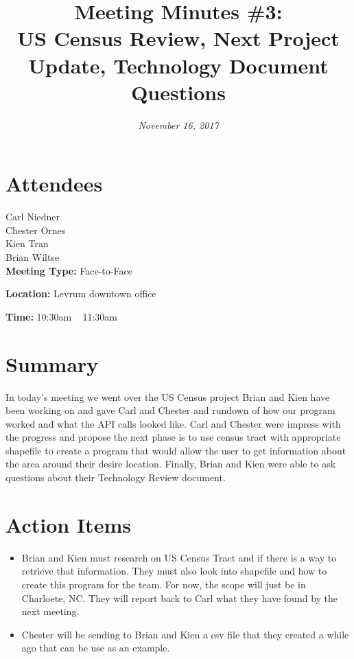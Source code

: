 \documentclass[10pt, onecolumn, draftclsnofoot, letterpaper, compsoc]{IEEEtran}
\title{Meeting Minutes \#3:\\ US Census Review, Next Project Update, Technology Document Questions}
\author{
	\textit{November 16, 2017}}
\begin{document}
\maketitle
\section{Attendees}
Carl Niedner\\
Chester Ornes\\
Kien Tran\\
Brian Wiltse\\

\textbf{Meeting Type:} Face-to-Face

\textbf{Location:} Levrum downtown office

\textbf{Time:} 10:30am ~ 11:30am

\section{Summary}
In today's meeting we went over the US Census project Brian and Kien have been working on and gave Carl and Chester and rundown of how our program worked and what the API calls looked like. 
Carl and Chester were impress with the progress and propose the next phase is to use census tract with appropriate shapefile to create a program that would allow the user to get information about the area around their desire location. 
Finally, Brian and Kien were able to ask questions about their Technology Review document.
\section{Action Items}
    \begin{itemize}
        \item Brian and Kien must research on US Census Tract and if there is a way to retrieve that information. 
They must also look into shapefile and how to create this program for the team. 
For now, the scope will just be in Charloete, NC. 
They will report back to Carl what they have found by the next meeting.
        \item Chester will be sending to Brian and Kien a csv file that they created a while ago that can be use as an example.
    \end{itemize}
\end{document}
